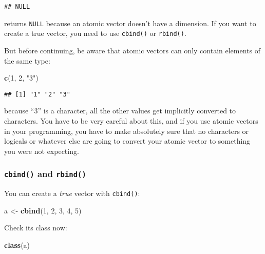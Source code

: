 \documentclass[
]{article}
\newenvironment{Shaded}{\begin{snugshade}}{\end{snugshade}}
\newcommand{\DecValTok}[1]{\textcolor[rgb]{0.00,0.00,0.81}{#1}}
\newcommand{\KeywordTok}[1]{\textcolor[rgb]{0.13,0.29,0.53}{\textbf{#1}}}
\newcommand{\NormalTok}[1]{#1}
\newcommand{\StringTok}[1]{\textcolor[rgb]{0.31,0.60,0.02}{#1}}
\begin{document}
\begin{verbatim}
## NULL
\end{verbatim}

returns \texttt{NULL} because an atomic vector doesn't have a dimension.
If you want to create a true vector, you need to use \texttt{cbind()} or \texttt{rbind()}.

But before continuing, be aware that atomic vectors can only contain elements of the same type:

\begin{Shaded}
\begin{Highlighting}[]
\KeywordTok{c}\NormalTok{(}\DecValTok{1}\NormalTok{, }\DecValTok{2}\NormalTok{, }\StringTok{"3"}\NormalTok{)}
\end{Highlighting}
\end{Shaded}

\begin{verbatim}
## [1] "1" "2" "3"
\end{verbatim}

because ``3'' is a character, all the other values get implicitly converted to characters. You have
to be very careful about this, and if you use atomic vectors in your programming, you have to make
absolutely sure that no characters or logicals or whatever else are going to convert your atomic
vector to something you were not expecting.

\hypertarget{cbind-and-rbind}{%
\subsubsection{\texorpdfstring{\texttt{cbind()} and \texttt{rbind()}}{cbind() and rbind()}}\label{cbind-and-rbind}}

You can create a \emph{true} vector with \texttt{cbind()}:

\begin{Shaded}
\begin{Highlighting}[]
\NormalTok{a \textless{}{-}}\StringTok{ }\KeywordTok{cbind}\NormalTok{(}\DecValTok{1}\NormalTok{, }\DecValTok{2}\NormalTok{, }\DecValTok{3}\NormalTok{, }\DecValTok{4}\NormalTok{, }\DecValTok{5}\NormalTok{)}
\end{Highlighting}
\end{Shaded}

Check its class now:

\begin{Shaded}
\begin{Highlighting}[]
\KeywordTok{class}\NormalTok{(a)}
\end{Highlighting}
\end{Shaded}
\end{document}
